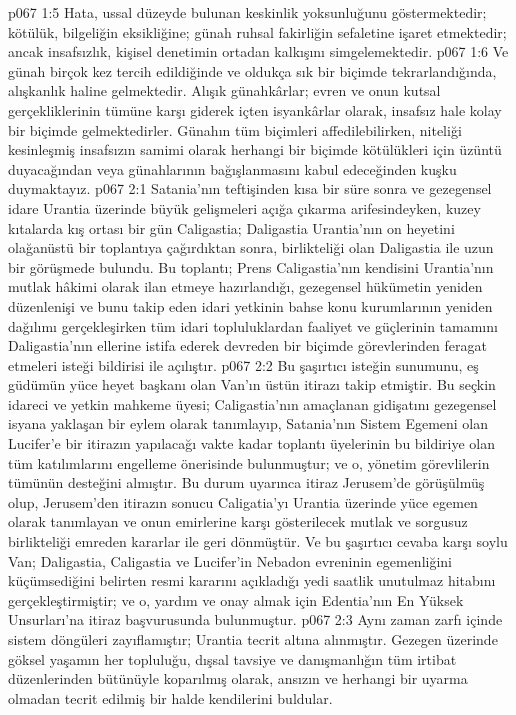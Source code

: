 \vs p067 1:5 Hata, ussal düzeyde bulunan keskinlik yoksunluğunu göstermektedir; kötülük, bilgeliğin eksikliğine; günah ruhsal fakirliğin sefaletine işaret etmektedir; ancak insafsızlık, kişisel denetimin ortadan kalkışını simgelemektedir.
\vs p067 1:6 Ve günah birçok kez tercih edildiğinde ve oldukça sık bir biçimde tekrarlandığında, alışkanlık haline gelmektedir. Alışık günahkârlar; evren ve onun kutsal gerçekliklerinin tümüne karşı giderek içten isyankârlar olarak, insafsız hale kolay bir biçimde gelmektedirler. Günahın tüm biçimleri affedilebilirken, niteliği kesinleşmiş insafsızın samimi olarak herhangi bir biçimde kötülükleri için üzüntü duyacağından veya günahlarının bağışlanmasını kabul edeceğinden kuşku duymaktayız.
\vs p067 2:1 Satania’nın teftişinden kısa bir süre sonra ve gezegensel idare Urantia üzerinde büyük gelişmeleri açığa çıkarma arifesindeyken, kuzey kıtalarda kış ortası bir gün Caligastia; Daligastia Urantia’nın on heyetini olağanüstü bir toplantıya çağırdıktan sonra, birlikteliği olan Daligastia ile uzun bir görüşmede bulundu. Bu toplantı; Prens Caligastia’nın kendisini Urantia’nın mutlak hâkimi olarak ilan etmeye hazırlandığı, gezegensel hükümetin yeniden düzenlenişi ve bunu takip eden idari yetkinin bahse konu kurumlarının yeniden dağılımı gerçekleşirken tüm idari topluluklardan faaliyet ve güçlerinin tamamını Daligastia’nın ellerine istifa ederek devreden bir biçimde görevlerinden feragat etmeleri isteği bildirisi ile açılıştır.
\vs p067 2:2 Bu şaşırtıcı isteğin sunumunu, eş güdümün yüce heyet başkanı olan Van’ın üstün itirazı takip etmiştir. Bu seçkin idareci ve yetkin mahkeme üyesi; Caligastia’nın amaçlanan gidişatını gezegensel isyana yaklaşan bir eylem olarak tanımlayıp, Satania’nın Sistem Egemeni olan Lucifer’e bir itirazın yapılacağı vakte kadar toplantı üyelerinin bu bildiriye olan tüm katılımlarını engelleme önerisinde bulunmuştur; ve o, yönetim görevlilerin tümünün desteğini almıştır. Bu durum uyarınca itiraz Jerusem’de görüşülmüş olup, Jerusem’den itirazın sonucu Caligatia’yı Urantia üzerinde yüce egemen olarak tanımlayan ve onun emirlerine karşı gösterilecek mutlak ve sorgusuz birlikteliği emreden kararlar ile geri dönmüştür. Ve bu şaşırtıcı cevaba karşı soylu Van; Daligastia, Caligastia ve Lucifer’in Nebadon evreninin egemenliğini küçümsediğini belirten resmi kararını açıkladığı yedi saatlik unutulmaz hitabını gerçekleştirmiştir; ve o, yardım ve onay almak için Edentia’nın En Yüksek Unsurları’na itiraz başvurusunda bulunmuştur.
\vs p067 2:3 Aynı zaman zarfı içinde sistem döngüleri zayıflamıştır; Urantia tecrit altına alınmıştır. Gezegen üzerinde göksel yaşamın her topluluğu, dışsal tavsiye ve danışmanlığın tüm irtibat düzenlerinden bütünüyle koparılmış olarak, ansızın ve herhangi bir uyarma olmadan tecrit edilmiş bir halde kendilerini buldular.
